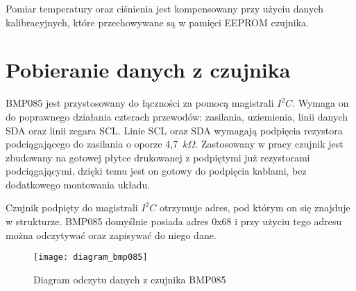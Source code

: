 Pomiar temperatury oraz ciśnienia jest kompensowany przy użyciu danych kalibracyjnych, które przechowywane są w pamięci EEPROM czujnika.

\section*{Pobieranie danych z czujnika}
BMP085 jest przystosowany do łączności za pomocą magistrali $I^2C$. Wymaga on do poprawnego działania czterach przewodów: zasilania, uziemienia, linii danych SDA oraz linii zegara SCL. Linie SCL oraz SDA wymagają podpięcia rezystora podciągającego do zasilania o oporze 4,7~$k\Omega$. Zastosowany w pracy czujnik jest zbudowany na gotowej płytce drukowanej z podpiętymi już rezystorami podciągającymi, dzięki temu jest on gotowy do podpięcia kablami, bez dodatkowego montowania układu.

Czujnik podpięty do magistrali $I^2C$ otrzymuje adres, pod którym on się znajduje w strukturze. BMP085 domyślnie posiada adres 0x68 i przy użyciu tego adresu można odczytywać oraz zapisywać do niego dane.

\begin{figure}[h]
\centering
\texttt{[image: diagram\_bmp085]}
\caption{Diagram odczytu danych z czujnika BMP085}
\label{fig:diagram_bmp085}
\end{figure}